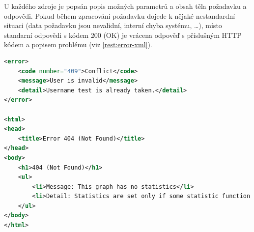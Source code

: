 \documentclass[thesis=M,czech]{FITthesis}[2014/05/6]
\begin{document}
\begin{figure}
	\caption[Struktura zdrojů RESTful služby \textit{WebGephi}]{}\label{fig:webgephi-restful}
\end{figure}

U každého zdroje je popsán popis možných parametrů a obsah těla požadavku a odpovědi. Pokud během zpracování požadavku
dojede k nějaké nestandardní situaci (data požadavku jsou nevalidní, interní chyba systému, \ldots), místo standarní 
odpovědi s kódem 200 (OK) je vrácena odpověď s příslušným HTTP kódem a popisem problému (viz \ref{rest:error-xml}).

\begin{lstlisting}[caption=XML a HTML chybová odpověď, label=rest:error-xml, language=xml]
<error>
    <code number="409">Conflict</code>
    <message>User is invalid</message>
    <detail>Username test is already taken.</detail>
</error>

<html>
<head>
    <title>Error 404 (Not Found)</title>
</head>
<body>
    <h1>404 (Not Found)</h1>
    <ul>
        <li>Message: This graph has no statistics</li>
        <li>Detail: Statistics are set only if some statistic function was applied previously</li>
    </ul>
</body>
</html>
\end{lstlisting}
\end{document}
